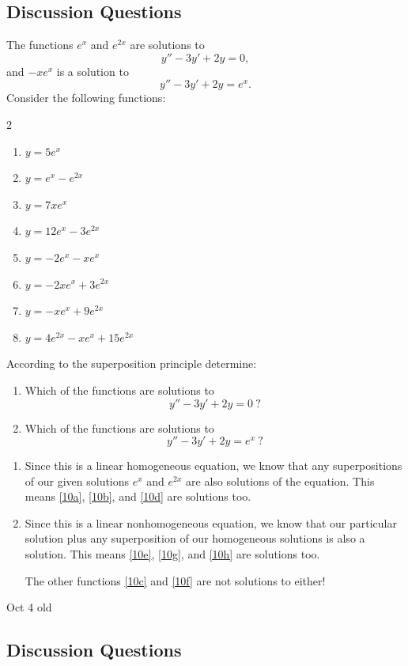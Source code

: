 \documentclass[12pt]{amsart}
\numberwithin{equation}{section}
\theoremstyle{plain} %
\newcommand{\Oct}[1]{Oct #1 old}
\theoremstyle{definition}
\theoremstyle{remark}
\begin{document}
\subsection*{Discussion Questions}
The functions $e^x$ and $e^{2x}$ are solutions to
\[ y'' - 3y' + 2y = 0,\]
and  $-xe^{x}$ is a solution to
\[ y'' - 3y' + 2y = e^{x}.\]
Consider the following functions:
\begin{multicols}{2}
\begin{enumerate}[label=(\alph*)]
\item\label{10a} $y= 5 e^x$
\item\label{10b} $y= e^x - e^{2x}$
\item\label{10c} $y= 7 xe^{x}$
\item\label{10d} $y= 12e^x -  3 e^{2x}$
\item\label{10e} $y=  -2 e^x - xe^{x}$
\item\label{10f} $y= -2 x e^x + 3 e^{2x}$
\item\label{10g} $y= - x e^x + 9 e^{2x}$
\item\label{10h} $y= 4 e^{2x} - x e^x + 15 e^{2x}$
\end{enumerate}
\end{multicols}
According to the superposition principle determine:
\begin{enumerate}
\item Which of the functions are solutions to
\[ y'' - 3y' + 2y = 0\ ?\]
\item Which of the functions are solutions to
\[ y'' - 3y' + 2y = e^x\ ?\]
\end{enumerate}
\begin{framed}
\begin{enumerate}
\item Since this is a linear homogeneous equation, we know that any superpositions of our given solutions $e^x$ and $e^{2x}$ are also solutions of the equation. This means \ref{10a}, \ref{10b}, and \ref{10d} are solutions too.
\item Since this is a linear nonhomogeneous equation, we know that our particular solution plus any superposition of our homogeneous solutions is also a solution. This means \ref{10e}, \ref{10g}, and \ref{10h} are solutions too.

The other functions \ref{10c} and \ref{10f} are not solutions to either!
\end{enumerate}
\end{framed}


\Oct{4}


	\subsection*{Discussion Questions}
	
\end{document}
